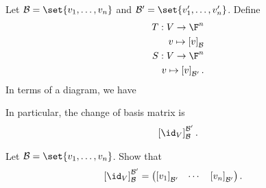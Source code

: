 \documentclass[10pt]{mypackage}
\begin{document}
Let $\mathcal{B} = \set{v_1,\dots,v_n}$ and $\mathcal{B}' = \set{v_1',\dots,v_n'}$. Define
\begin{align*}
  T: V\rightarrow \F^{n}\\
  v\mapsto \left[v\right]_{\mathcal{B}}\\
  S: V\rightarrow \F^{n}\\
  v\mapsto \left[v\right]_{\mathcal{B}'}.
\end{align*}
In terms of a diagram, we have
\begin{center}
\end{center}
In particular, the change of basis matrix is
\begin{align*}
  \left[\id_{V}\right]_{\mathcal{B}}^{\mathcal{B}'}.
\end{align*}
\begin{exercise}
  Let $\mathcal{B} = \set{v_1,\dots,v_n}$. Show that
  \begin{align*}
    \left[\id_{V}\right]_{\mathcal{B}}^{\mathcal{B}'} &= \begin{pmatrix}\left[v_1\right]_{\mathcal{B'}} & \cdots & \left[v_n\right]_{\mathcal{B}'}\end{pmatrix}.
  \end{align*}
\end{exercise}
\end{document}
